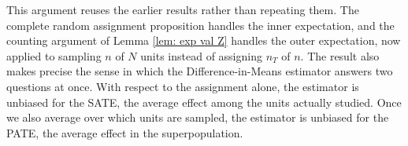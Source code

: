 \documentclass[12pt,leqno]{article}
\theoremstyle{newstyle}
\begin{document}
This argument reuses the earlier results rather than repeating them. The complete random assignment proposition handles the inner expectation, and the counting argument of Lemma \ref{lem: exp val Z} handles the outer expectation, now applied to sampling $n$ of $N$ units instead of assigning $n_T$ of $n$. The result also makes precise the sense in which the Difference-in-Means estimator answers two questions at once. With respect to the assignment alone, the estimator is unbiased for the SATE, the average effect among the units actually studied. Once we also average over which units are sampled, the estimator is unbiased for the PATE, the average effect in the superpopulation.

% 
% 
\end{document}
